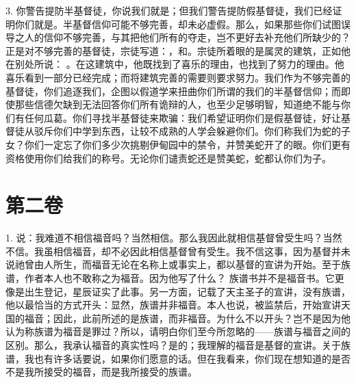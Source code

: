 3. 你警告提防半基督徒，你说我们就是；但我们警告提防假基督徒，我们已经证明你们就是。半基督信仰可能不够完善，却未必虚假。那么，如果那些你们试图误导之人的信仰不够完善，与其把他们所有的夺走，岂不更好去补充他们所缺少的？正是对不够完善的基督徒，宗徒写道：，和。宗徒所着眼的是属灵的建筑，正如他在别处所说： 。在这建筑中，他既找到了喜乐的理由，也找到了努力的理由。他喜乐看到一部分已经完成；而将建筑完善的需要则要求努力。我们作为不够完善的基督徒，你们追逐我们，企图以假道学来扭曲你们所谓的我们的半基督信仰；而即使那些信德欠缺到无法回答你们所有诡辩的人，也至少足够明智，知道绝不能与你们有任何瓜葛。你们寻找半基督徒来欺骗：我们希望证明你们是假基督徒，好让基督徒从驳斥你们中学到东西，让较不成熟的人学会躲避你们。你们称我们为蛇的子女？你们一定忘了你们多少次挑剔伊甸园中的禁令，并赞美蛇开了的眼。你们更有资格使用你们给我们的称号。无论你们谴责蛇还是赞美蛇，蛇都认你们为子。\par



\section{ 第二卷}

\par

1. 说：我难道不相信福音吗？当然相信。那么我因此就相信基督曾受生吗？当然不信。我虽相信福音，却不必因此相信基督曾有受生。我不信这事，因为基督并未说祂曾由人所生，而福音无论在名称上或事实上，都以基督的宣讲为开始。至于族谱，作者本人也不敢称之为福音。因为他写了什么？ 族谱书并不是福音书。它更像是出生登记，星辰证实了此事。另一方面，记载了天主圣子的宣讲，没有族谱，他以最恰当的方式开头：显然，族谱并非福音。本人也说，被监禁后，开始宣讲天国的福音；因此，此前所述的是族谱，而非福音。为什么不以开头？岂不是因为他认为称族谱为福音是罪过？所以，请明白你们至今所忽略的——族谱与福音之间的区别。那么，我承认福音的真实性吗？是的；我理解的福音是基督的宣讲。关于族谱，我也有许多话要说，如果你们愿意的话。但在我看来，你们现在想知道的是否不是我所接受的福音，而是我所接受的族谱。\par

